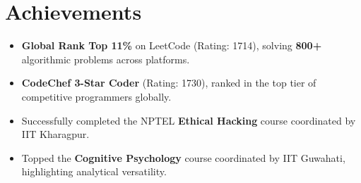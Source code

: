 \documentclass[letterpaper, 10pt]{article}
\newcommand{\resumeItem}[1]{
  \item\small{
    {#1 \vspace{-1pt}}
  }
}
\newcommand{\resumeItemListStart}{\begin{itemize}[itemsep=3pt, parsep=0pt]}
\newcommand{\resumeItemListEnd}{\end{itemize}\vspace{-5pt}}
\begin{document}
\section{Achievements}
  \resumeItemListStart
    \resumeItem{\textbf{Global Rank Top 11\%} on LeetCode (Rating: 1714), solving \textbf{800+} algorithmic problems across platforms.}
    \resumeItem{\textbf{CodeChef 3-Star Coder} (Rating: 1730), ranked in the top tier of competitive programmers globally.}
    \resumeItem{Successfully completed the NPTEL \textbf{Ethical Hacking} course coordinated by IIT Kharagpur.}
    \resumeItem{Topped the \textbf{Cognitive Psychology} course coordinated by IIT Guwahati, highlighting analytical versatility.}
  \resumeItemListEnd
\end{document}
